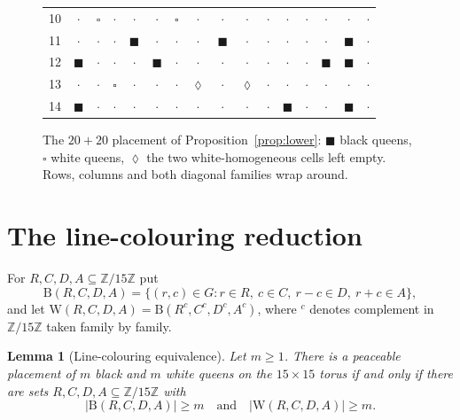 \documentclass[11pt]{amsart}
\newtheorem{lemma}[theorem]{Lemma}
\theoremstyle{remark}
\newcommand{\Z}{\mathbb{Z}}
\newcommand{\Zn}{\Z/15\Z}
\newcommand{\Bl}{\mathrm{B}}
\newcommand{\Wh}{\mathrm{W}}
\begin{document}
\begin{figure}[t]
{\begin{tabular}{r|*{15}{c}}
10 & $\cdot$ & $\square$ & $\cdot$ & $\cdot$ & $\cdot$ & $\square$ & $\cdot$ & $\cdot$ & $\cdot$ & $\cdot$ & $\cdot$ & $\cdot$ & $\cdot$ & $\cdot$ & $\cdot$ \\
11 & $\cdot$ & $\cdot$ & $\cdot$ & $\blacksquare$ & $\cdot$ & $\cdot$ & $\cdot$ & $\blacksquare$ & $\cdot$ & $\cdot$ & $\cdot$ & $\cdot$ & $\cdot$ & $\blacksquare$ & $\cdot$ \\
12 & $\blacksquare$ & $\cdot$ & $\cdot$ & $\cdot$ & $\blacksquare$ & $\cdot$ & $\cdot$ & $\cdot$ & $\cdot$ & $\cdot$ & $\cdot$ & $\cdot$ & $\blacksquare$ & $\blacksquare$ & $\cdot$ \\
13 & $\cdot$ & $\cdot$ & $\square$ & $\cdot$ & $\cdot$ & $\cdot$ & $\lozenge$ & $\cdot$ & $\lozenge$ & $\cdot$ & $\cdot$ & $\cdot$ & $\cdot$ & $\cdot$ & $\cdot$ \\
14 & $\blacksquare$ & $\cdot$ & $\cdot$ & $\cdot$ & $\cdot$ & $\cdot$ & $\cdot$ & $\cdot$ & $\cdot$ & $\cdot$ & $\blacksquare$ & $\cdot$ & $\cdot$ & $\blacksquare$ & $\cdot$ \\
\end{tabular}}
\caption{The $20+20$ placement of Proposition~\ref{prop:lower}: $\blacksquare$ black queens, $\square$ white queens, $\lozenge$ the two white-homogeneous cells left empty. Rows, columns and both diagonal families wrap around.}\label{fig:board}
\end{figure}

\section{The line-colouring reduction}\label{sec:reduction}

For $R,C,D,A\subseteq\Zn$ put
\[
\Bl(R,C,D,A)=\{(r,c)\in G: r\in R,\ c\in C,\ r-c\in D,\ r+c\in A\},
\]
and let $\Wh(R,C,D,A)=\Bl(R^{c},C^{c},D^{c},A^{c})$, where ${}^{c}$ denotes complement in $\Zn$ taken family by family.

\begin{lemma}[Line-colouring equivalence]\label{lem:lines}
Let $m\ge 1$. There is a peaceable placement of $m$ black and $m$ white queens on the $15\times 15$ torus if and only if there are sets $R,C,D,A\subseteq\Zn$ with
\[
|\Bl(R,C,D,A)|\ge m
\quad\text{and}\quad
|\Wh(R,C,D,A)|\ge m .
\]
\end{lemma}
\end{document}
